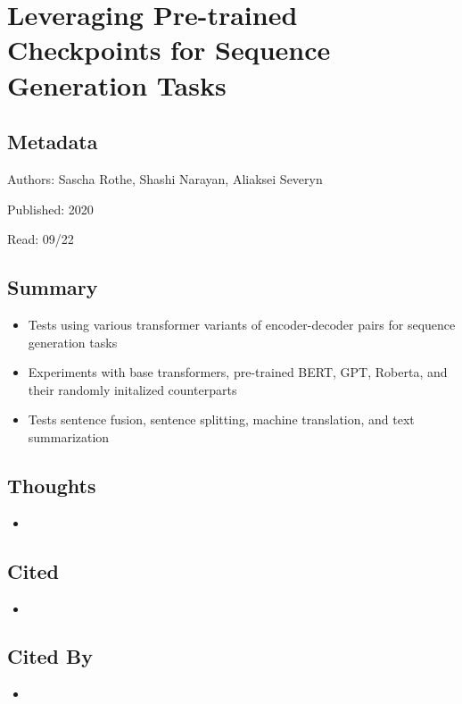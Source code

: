 \documentclass{article}
\begin{document}
\pagebreak


\section*{Leveraging Pre-trained Checkpoints for Sequence Generation Tasks}

\subsection*{Metadata}

\noindent Authors: Sascha Rothe, Shashi Narayan, Aliaksei Severyn

\noindent Published: 2020

\noindent Read: 09/22

\subsection*{Summary}
\begin{itemize}
	\item Tests using various transformer variants of encoder-decoder pairs for sequence generation tasks
	\item Experiments with base transformers, pre-trained BERT, GPT, Roberta, and their randomly initalized counterparts
	\item Tests sentence fusion, sentence splitting, machine translation, and text summarization
\end{itemize}

\subsection*{Thoughts}
\begin{itemize}
	\item
\end{itemize}

\subsection*{Cited}
\begin{itemize}
	\item
\end{itemize}

\subsection*{Cited By}
\begin{itemize}
	\item
\end{itemize}
\end{document}
